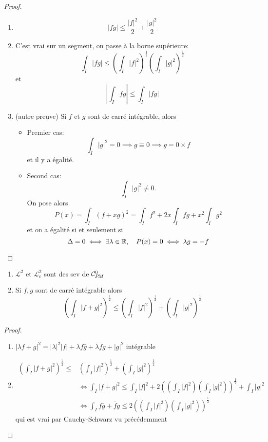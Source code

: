\begin{proof}~
    \begin{enumerate}
        \item  \[
                |fg|\leq \frac{|f|^2}2+\frac{|g|^2}2
            \]
        \item C'est vrai sur un segment, on passe à la borne supérieure: \[
                \int_I|fg|\leq \left( \int_I|f|^2 \right)^{\frac12} \left( \int_I|g|^2 \right)^{\frac12}
            \]
            et \[
                \left| \int_Ifg \right|\leq \int_I|fg|
            \]
        \item (autre preuve) Si $f$ et $g$ sont de carré intégrable, alors \begin{itemize}
            \item Premier cas: \[
                    \int_I|g|^2=0\implies g\equiv 0\implies g=0\times f
                \]
                et il y a égalité.
            \item Second cas: \[
                    \int_I|g|^2\neq 0.
                \]
                On pose alors \[
                    P(x)=\int_I(f+xg)^2=\int_If^2+2x\int_Ifg+x^2\int_Ig^2
                \]
                et on a égalité si et seulement si \[ \Delta=0\iff \exists \lambda\in\mathbb R, \quad P(x)=0\iff \lambda g=-f\]
        \end{itemize}
    \end{enumerate}
\end{proof}

\begin{thm}
    \begin{enumerate}
        \item $\mathcal L^2$ et $\mathcal L^2_c$ sont des sev de $\CPM$
        \item Si $f, g$ sont de carré intégrable alors \[
                \left( \int_I|f+g|^2 \right)^{\frac12}\leq \left( \int_I|f|^2 \right)^{\frac12}+ \left( \int_I|g|^2 \right)^{\frac12}
            \]
    \end{enumerate}
\end{thm}

\begin{proof}~
    \begin{enumerate}
        \item $|\lambda f+g|^2=|\lambda|^2|f|+\lambda f\bar g+\bar \lambda\bar fg+|g|^2$ intégrable
        \item \begin{align*}
                \left( \int_I|f+g|^2 \right)^{\frac12}\leq &\left( \int_I|f|^2 \right)^{\frac12}+ \left( \int_I|g|^2 \right)^{\frac12} \\&\iff \int_I|f+g|^2\leq \int_I|f|^2+2 \left( \left( \int_I|f|^2 \right) \left( \int_I|g|^2 \right) \right)^{\frac12}+\int_I|g|^2\\ &\iff \int_If\bar g+\bar fg\leq 2\left( \left( \int_I|f|^2 \right) \left( \int_I|g|^2 \right) \right)^{\frac12}
        \end{align*}
        qui est vrai par Cauchy-Schwarz vu précédemment
    \end{enumerate}
\end{proof}


